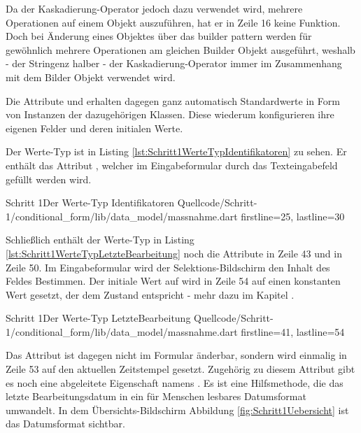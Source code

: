 Da der Kaskadierung-Operator jedoch dazu verwendet wird, mehrere Operationen auf einem Objekt auszuführen, hat er in Zeile 16 keine Funktion. Doch bei Änderung eines Objektes über das builder pattern werden für gewöhnlich mehrere Operationen am gleichen Builder Objekt ausgeführt, weshalb - der Stringenz halber - der Kaskadierung-Operator immer  im Zusammenhang mit dem Bilder Objekt verwendet wird.

Die Attribute  und   erhalten dagegen ganz automatisch Standardwerte in Form von Instanzen der dazugehörigen Klassen. Diese wiederum konfigurieren ihre eigenen Felder und deren initialen Werte.



Der Werte-Typ  ist in Listing \ref{lst:Schritt1WerteTypIdentifikatoren} zu sehen. Er enthält das Attribut , welcher im Eingabeformular durch das Texteingabefeld gefüllt werden wird.

\begin{alexlisting}{Schritt 1}{Der Werte-Typ Identifikatoren}
  {Quellcode/Schritt-1/conditional_form/lib/data_model/massnahme.dart}
  {firstline=25, lastline=30}
  \label{lst:Schritt1WerteTypIdentifikatoren}
\end{alexlisting}

Schließlich enthält der Werte-Typ  in Listing \ref{lst:Schritt1WerteTypLetzteBearbeitung} noch die Attribute  in Zeile 43 und  in Zeile 50. Im Eingabeformular wird der Selektions-Bildschirm den Inhalt des Feldes  Bestimmen. Der initiale Wert auf wird in Zeile 54 auf einen konstanten Wert gesetzt, der dem Zustand  entspricht - mehr dazu im Kapitel .

\begin{alexlisting}{Schritt 1}{Der Werte-Typ LetzteBearbeitung}
  {Quellcode/Schritt-1/conditional_form/lib/data_model/massnahme.dart}
  {firstline=41, lastline=54}
  \label{lst:Schritt1WerteTypLetzteBearbeitung}
\end{alexlisting}

Das Attribut  ist dagegen nicht im Formular änderbar, sondern wird einmalig in Zeile 53 auf den aktuellen Zeitstempel gesetzt. Zugehörig zu diesem Attribut gibt es noch eine abgeleitete Eigenschaft namens  .  Es ist eine Hilfsmethode, die das letzte Bearbeitungsdatum in ein für Menschen lesbares Datumsformat umwandelt. In dem Übersichts-Bildschirm Abbildung \ref{fig:Schritt1Uebersicht} ist das Datumsformat sichtbar.

